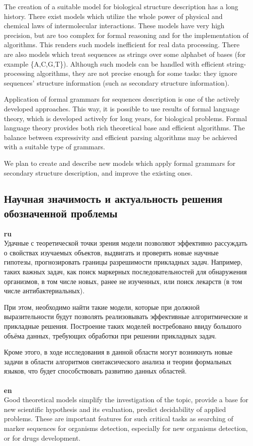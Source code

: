\documentclass[12pt]{article}  %
\theoremstyle{remark}
\begin{document}
The creation of a suitable model for biological structure description has a long history.
There exist models which utilize the whole power of physical and chemical laws of intermolecular interactions.
These models have very high precision, but are too complex for formal reasoning and for the implementation of algorithms. This renders such models inefficient for real data processing.
There are also models which treat sequences as strings over some alphabet of bases (for example \{A,C,G,T\}).
Although such models can be handled with efficient string-processing algorithms, they are not precise enough for some tasks: they ignore sequences' structure information (such as secondary structure information).

Application of formal grammars for sequences description is one of the actively developed approaches.
This way, it is possible to use results of formal language theory, which is developed actively for long years, for biological problems.
Formal language theory provides both rich theoretical base and efficient algorithms.
The balance between expressivity and efficient parsing algorithms may be achieved with a suitable type of grammars.

We plan to create and describe new models which apply formal grammars for secondary structure description, and improve the existing ones.

\subsection{Научная значимость и актуальность решения обозначенной проблемы}

\textbf{ru}\\
Удачные с теоретической точки зрения модели позволяют эффективно рассуждать о свойствах изучаемых объектов, выдвигать и проверять новые научные гипотезы, прогнозировать границы разрешимости прикладных задач. Например, таких важных задач, как поиск маркерных последовательностей для обнаружения организмов, в том числе новых, ранее не изученных, или поиск лекарств (в том числе антибактериальных).

При этом, необходимо найти такие модели, которые при должной выразительности будут позволять реализовывать эффективные алгоритмические и прикладные решения.
Построение таких моделей востребовано ввиду большого объёма данных, требующих обработки при решении прикладных задач.

Кроме этого, в ходе исследования в данной области могут возникнуть новые задачи в области алгоритмов синтаксического анализа и теории формальных языков, что будет способствовать развитию данных областей.
\\
\\
\textbf{en}\\
Good theoretical models simplify the investigation of the topic, provide a base for new scientific hypothesis and its evaluation, predict decidability of applied problems.
These are important features for such critical tasks as searching of marker sequences for organisms detection, especially for new organisms detection, or for drugs development.
\end{document}
